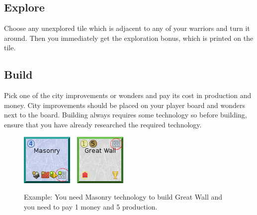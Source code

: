 \documentclass[11pt,a4paper,titlepage]{article}
\begin{document}
{{  }\label{subsec:move}
  \subsection{Explore}{
    Choose any unexplored tile which is adjacent to any of your warriors and
    turn it around. Then you immediately get the exploration bonus, which is
    printed on the tile.
  }\label{subsec:explore}
  \subsection{Build}{
    Pick one of the city improvements or wonders and pay its cost in production
    and money. City improvements should be placed on your player board and
    wonders next to the board. Building always requires some technology so
    before building, ensure that you have already researched the required
    technology.

    \begin{figure}[!htb]
      \begin{minipage}[c]{0.2\textwidth}
        \label{fig:tech_irrigation}
        \includegraphics[scale=.6]{doe_example_build.png}
      \end{minipage}\hfill
      \begin{minipage}[c]{0.55\textwidth}
        \captionsetup{labelformat=empty, justification=justified, singlelinecheck=false}
        \caption{Example: You need Masonry technology to build Great Wall and you need to pay 1 money and 5 production.}
      \end{minipage}\hfill
      \label{fig:example_towns}
    \end{figure}

  }\label{subsec:build}
}
\end{document}
